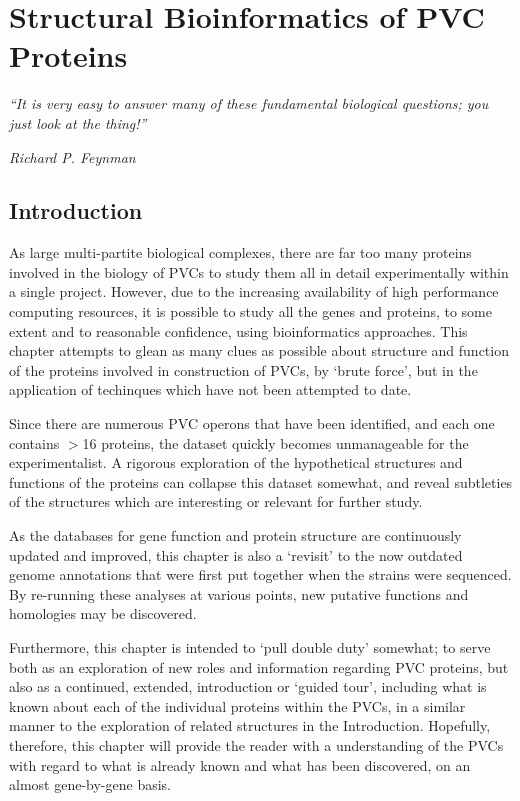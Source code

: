 \pagestyle{IHA-fancy-style}


\chapter{Structural Bioinformatics of PVC Proteins}\label{structbioinfo}
\epigraph{\emph{``It is very easy to answer many of these fundamental biological questions; you just look at the thing!''}}{\textit{Richard P. Feynman}}

\section{Introduction}




As large multi-partite biological complexes, there are far too many proteins involved in the biology of PVCs to study them all in detail experimentally within a single project. However, due to the increasing availability of high performance computing resources, it is possible to study all the genes and proteins, to some extent and to reasonable confidence, using bioinformatics approaches. This chapter attempts to glean as many clues as possible about structure and function of the proteins involved in construction of PVCs, by `brute force', but in the application of techinques which have not been attempted to date.

Since there are numerous PVC operons that have been identified, and each one contains $>$16 proteins, the dataset quickly becomes unmanageable for the experimentalist. A rigorous exploration of the hypothetical structures and functions of the proteins can collapse this dataset somewhat, and reveal subtleties of the structures which are interesting or relevant for further study. 

As the databases for gene function and protein structure are continuously updated and improved, this chapter is also a `revisit' to the now outdated genome annotations that were first put together when the strains were sequenced. By re-running these analyses at various points, new putative functions and homologies may be discovered.

Furthermore, this chapter is intended to `pull double duty' somewhat; to serve both as an exploration of new roles and information regarding PVC proteins, but also as a continued, extended, introduction or `guided tour', including what is known about each of the individual proteins within the PVCs, in a similar manner to the exploration of related structures in the Introduction. Hopefully, therefore, this chapter will provide the reader with a understanding of the PVCs with regard to what is already known and what has been discovered, on an almost gene-by-gene basis.

